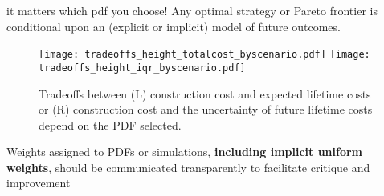 \begin{block}{it matters which pdf you choose!}
    Any optimal strategy or Pareto frontier is conditional upon an (explicit or implicit) model of future outcomes.
    \begin{framed}
        \begin{figure}
            \centering
            \texttt{[image: tradeoffs\_height\_totalcost\_byscenario.pdf]}%
            \texttt{[image: tradeoffs\_height\_iqr\_byscenario.pdf]}
            \caption{
                Tradeoffs between (L) construction cost and expected lifetime costs or (R) construction cost and the uncertainty of future lifetime costs depend on the PDF selected.
            }
            \label{fig:tradeoffs}
        \end{figure}
    \end{framed}
    Weights assigned to PDFs or simulations, \textbf{including implicit uniform weights}, should be communicated transparently to facilitate critique and improvement
\end{block}